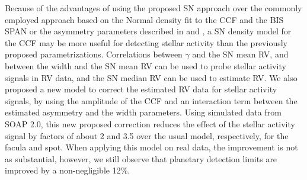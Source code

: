 \documentclass{aa}
\begin{document}
Because of the advantages of using the proposed SN approach over the commonly employed approach based on the Normal density fit to the CCF and the BIS SPAN or the asymmetry parameters described in \citet{Boisse-2011} and \citet{Figueira-2013}, a SN density model for the CCF may be more useful for detecting stellar activity than the previously proposed parametrizations.
Correlations between $\gamma$ and the SN mean RV, and between the width and the SN mean RV can be used to probe stellar activity signals in RV data, and the SN median RV can be used to estimate RV.
We also proposed a new model to correct the estimated RV data for stellar activity signals, by using the amplitude of the CCF and an interaction term between the estimated asymmetry and the width parameters. Using simulated data from SOAP 2.0, this new proposed correction reduces the effect of the stellar activity signal by factors of about 2 and 3.5 over the usual model, respectively, for the facula and spot. When applying this model on real data, the improvement is not as substantial, however, we still observe that planetary detection limits are improved by a non-negligible 12\%.

\end{document}
